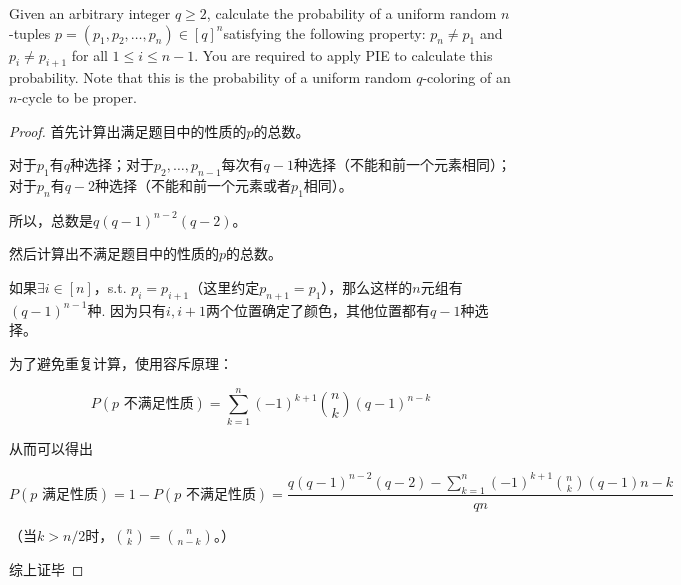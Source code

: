 \documentclass[12pt, a4paper, oneside]{ctexart}
\begin{document}

\begin{problem}
Given an arbitrary integer $q \geq 2$, calculate the probability of a uniform random $n$-tuples $ p = (p_1,p_2,\ldots,p_n)\in[q]^n $satisfying the following property: $p_n \neq p_1$ and $p_i \neq p_{i+1}$ for all $1 \leq i \leq n-1$. You are required to apply PIE to calculate this probability. Note that this is the probability of a uniform random $q$-coloring of an $n$-cycle to be proper.
\end{problem}

\begin{proof}
  首先计算出满足题目中的性质的$p$的总数。

  对于$p_1$有$q$种选择；对于$p_2,\ldots,p_{n-1}$每次有$q-1$种选择（不能和前一个元素相同）；对于$p_n$有$q-2$种选择（不能和前一个元素或者$p_1$相同）。

  所以，总数是$q(q-1)^{n-2}(q-2)$。

  然后计算出不满足题目中的性质的$p$的总数。

  如果$\exists i\in[n]$，s.t. $p_i=p_{i+1}$（这里约定$p_{n+1}=p_1$），那么这样的$n$元组有$(q-1)^{n-1}$种. 因为只有$i,i+1$两个位置确定了颜色，其他位置都有$q-1$种选择。


  为了避免重复计算，使用容斥原理：

  $$ P(p \text{ 不满足性质}) = \sum_{k=1}^n (-1)^{k+1} {n \choose k} (q-1)^{n-k} $$

  从而可以得出

  $$ P(p \text{ 满足性质}) = 1 - P(p \text{ 不满足性质}) = \frac{q(q-1)^{n-2}(q-2) - \sum_{k=1}^n (-1)^{k+1} {n \choose k} (q-1){n-k}}{qn} $$

  （当$k>n/2$时，${n \choose k}= {n \choose n-k}$。）

  综上证毕


\end{proof}
\end{document}
